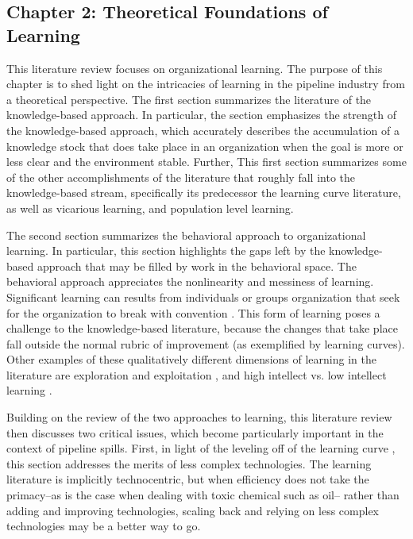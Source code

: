 \subsection{Chapter 2: Theoretical Foundations of Learning}

This literature review focuses on organizational learning. The purpose of this chapter is to shed light on the intricacies of learning in the pipeline industry from a theoretical perspective. The first section summarizes the literature of the knowledge-based approach. In particular, the section emphasizes the strength of the knowledge-based approach, which accurately describes the accumulation of a knowledge stock that does take place in an organization when the goal is more or less clear and the environment stable. Further, This first section summarizes some of the other accomplishments of the literature that roughly fall into the knowledge-based stream, specifically its predecessor the learning curve literature, as well as vicarious learning, and population level learning.

The second section summarizes the behavioral approach to organizational learning. In particular, this section highlights the gaps left by the knowledge-based approach that may be filled by work in the behavioral space. The behavioral approach appreciates the nonlinearity and messiness of learning. Significant learning can results from individuals or groups organization that seek for the organization to break with convention \citep{Argyris1978}. This form of learning poses a challenge to the knowledge-based literature, because the changes that take place fall outside the normal rubric of improvement (as exemplified by learning curves). Other examples of these qualitatively different dimensions of learning in the literature are exploration and exploitation \citep{March1991}, and high intellect vs. low intellect learning \citep{March2010}.

Building on the review of the two approaches to learning, this literature review then discusses two critical issues, which become particularly important in the context of pipeline spills. First, in light of the leveling off of the learning curve \citep[which in the pipeline industry takes the shape of a "baseline" of spills, or "normal accidents"][]{Perrow1984}, this section addresses the merits of less complex technologies. The learning literature is implicitly technocentric, but when efficiency does not take the primacy--as is the case when dealing with toxic chemical such as oil-- rather than adding and improving technologies, scaling back and relying on less complex technologies may be a better way to go.

